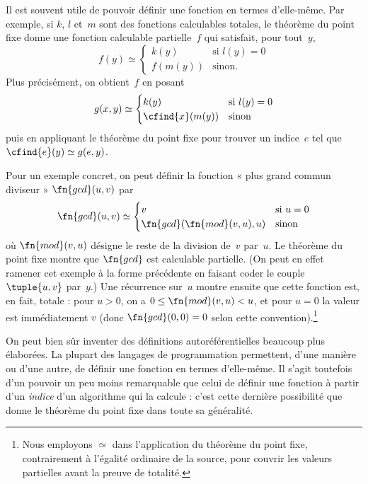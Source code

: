 \documentclass[../../../include/open-logic-section]{subfiles}
\begin{document}

Il est souvent utile de pouvoir définir une fonction
en termes d'elle-même. Par exemple, si $k$, $l$
et~$m$ sont des fonctions calculables totales, le théorème
du point fixe donne une fonction calculable
partielle~$f$ qui satisfait, pour tout~$y$,
\[
f(y) \simeq
\begin{cases}
k(y) & \text{si $l(y) = 0$} \\
f(m(y)) & \text{sinon.}
\end{cases}
\]
Plus précisément, on obtient~$f$ en posant
\[
g(x,y) \simeq
\begin{cases}
k(y) & \text{si $l(y) = 0$} \\
\cfind{x}(m(y)) & \text{sinon}
\end{cases}
\]
puis en appliquant le théorème du point fixe
pour trouver un indice~$e$ tel que
$\cfind{e}(y) \simeq g(e,y)$.

Pour un exemple concret, on peut définir la
fonction « plus grand commun diviseur »
$\fn{gcd}(u,v)$ par
\[
\fn{gcd}(u,v) \simeq
\begin{cases}
v & \text{si $u = 0$} \\
\fn{gcd}(\fn{mod}(v, u), u) & \text{sinon}
\end{cases}
\]
où $\fn{mod}(v,u)$ désigne le reste de la
division de~$v$ par~$u$. Le théorème du point
fixe montre que $\fn{gcd}$ est calculable
partielle. (On peut en effet ramener cet
exemple à la forme précédente en faisant coder
le couple $\tuple{u,v}$ par~$y$.) Une récurrence
sur~$u$ montre ensuite que cette fonction est,
en fait, totale : pour $u>0$, on a $0\leq\fn{mod}(v,u)<u$, et pour $u=0$ la valeur est immédiatement $v$ (donc $\fn{gcd}(0,0)=0$ selon cette convention).\footnote{Nous employons $\simeq$ dans l'application du théorème du point fixe, contrairement à l'égalité ordinaire de la source, pour couvrir les valeurs partielles avant la preuve de totalité.}

On peut bien sûr inventer des définitions
autoréférentielles beaucoup plus élaborées.
La plupart des langages de programmation
permettent, d'une manière ou d'une autre, de
définir une fonction en termes d'elle-même.
Il s'agit toutefois d'un pouvoir un peu moins
remarquable que celui de définir une fonction
à partir d'un \emph{indice} d'un algorithme qui
la calcule : c'est cette dernière possibilité
que donne le théorème du point fixe dans toute
sa généralité.
\end{document}
